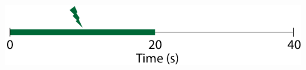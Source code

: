 \documentclass[utf8]{FrontiersinHarvard} %
\begin{document}
\begin{subfigure}
\begin{minipage}[b]{0.49\textwidth}
        \caption{}
        \label{figs:methods:rbSTDP}
    \end{minipage}%
\setcounter{figure}{1}
\setcounter{subfigure}{5}
    \begin{minipage}[b]{0.4\textwidth}
        \includegraphics[width=\linewidth]{methods/stimulation_protocol}
        \caption{}
        \label{figs:methods:stimulation_protocol}
    \end{minipage}%
\setcounter{figure}{1}
\setcounter{subfigure}{-1}
    \caption{Network, neuron, and synaptic models and stimulation protocol. {\textbf{(A)}} A pool of \SI{200} excitatory neurons receive input from \SI{50} independent Poisson processes. All recurrent synapses undergo STDP. \textbf{(B)} A synaptic input, $s$, and one neuron's refractoriness, $r$, and membrane potential, $v$. \textbf{(C)} STDP learning window. \textbf{(D)} Synaptic change dependence on weight. \textbf{(E)} Three different scenarios for heterosynaptic plasticity: i) potentiation accompanied by heterosynaptic depression of resources (blue circles) from neighbors, ii) potentiation with resources from the pool, and iii) depression. \textbf{(F)} Input is provided for the first \SI{20}{\second}.}
    \label{figs:methods}
\end{subfigure}
\end{document}
